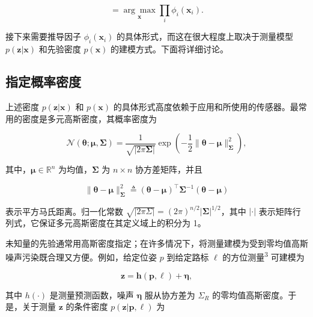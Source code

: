 \begin{equation}
= \underset {\boldsymbol {x}} {\arg \max} \prod_ {i} \phi_ {i} (\boldsymbol {x} _ {i}).\tag{1.8b}
\end{equation}

接下来需要推导因子 $\phi_i(\pmb x_i)$ 的具体形式，而这在很大程度上取决于测量模型 $p(\boldsymbol z|\boldsymbol x)$ 和先验密度 $p(\pmb x)$ 的建模方式。下面将详细讨论。

\subsection{指定概率密度}

上述密度 $p(\boldsymbol z|\boldsymbol x)$ 和 $p(\pmb x)$ 的具体形式高度依赖于应用和所使用的传感器。最常用的密度是多元高斯密度，其概率密度为

\begin{equation}
\mathcal {N} (\boldsymbol {\theta}; \boldsymbol {\mu}, \boldsymbol {\Sigma}) = \frac {1}{\sqrt {| 2 \pi \boldsymbol {\Sigma} |}} \exp \left(- \frac {1}{2} \| \boldsymbol {\theta} - \boldsymbol {\mu} \| _ {\boldsymbol {\Sigma}} ^ {2}\right),\tag{1.9}
\end{equation}

其中，$\pmb\mu\in\mathbb{R}^n$ 为均值，$\pmb\Sigma$ 为 $n\times n$ 协方差矩阵，并且

\begin{equation}
\| \boldsymbol {\theta} - \boldsymbol {\mu} \| _ {\boldsymbol {\Sigma}} ^ {2} \triangleq (\boldsymbol {\theta} - \boldsymbol {\mu}) ^ {\top} \boldsymbol {\Sigma} ^ {- 1} (\boldsymbol {\theta} - \boldsymbol {\mu})\tag{1.10}
\end{equation}

表示平方马氏距离。归一化常数 $\sqrt{|2\pi\Sigma|}=(2\pi)^{n/2}|\pmb\Sigma|^{1/2}$，其中 $|\cdot|$ 表示矩阵行列式，它保证多元高斯密度在其定义域上的积分为 1。

未知量的先验通常用高斯密度指定；在许多情况下，将测量建模为受到零均值高斯噪声污染既合理又方便。例如，给定位姿 $p$ 到给定路标 $\ell$ 的方位测量\textsuperscript{3} 可建模为

\begin{equation}
\boldsymbol {z} = \boldsymbol {h} (\boldsymbol {p}, \ell) + \boldsymbol {\eta},\tag{1.11}
\end{equation}

其中 $h(\cdot)$ 是测量预测函数，噪声 $\pmb\eta$ 服从协方差为 $\Sigma_R$ 的零均值高斯密度。于是，关于测量 $\boldsymbol z$ 的条件密度 $p(\boldsymbol z|\boldsymbol p,\boldsymbol\ell)$ 为

